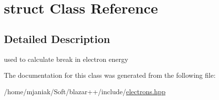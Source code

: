 \hypertarget{classstruct}{\section{struct Class Reference}
\label{classstruct}
}


\subsection{Detailed Description}
used to calculate break in electron energy 

The documentation for this class was generated from the following file\-:\begin{DoxyCompactItemize}
\item 
/home/mjaniak/\-Soft/blazar++/include/\hyperlink{electrons_8hpp}{electrons.\-hpp}\end{DoxyCompactItemize}

